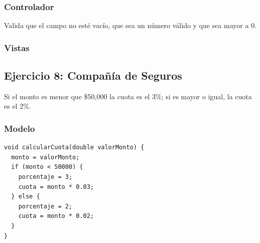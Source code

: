 \documentclass{article}
\begin{document}
\subsubsection{Controlador}
Valida que el campo no esté vacío, que sea un número válido y que sea mayor a 0.

\subsubsection{Vistas}
\begin{figure}[H]
\centering
\begin{minipage}{0.45\textwidth}\centering
\end{minipage}\hfill
\begin{minipage}{0.45\textwidth}\centering
\end{minipage}
\end{figure}

\subsection{Ejercicio 8: Compañía de Seguros}
Si el monto es menor que \$50,000 la cuota es el 3\%; si es mayor o igual, la cuota es el 2\%.

\subsubsection{Modelo}
\begin{tcolorbox}[title=CuotaFinanzaModel]
\begin{lstlisting}
void calcularCuota(double valorMonto) {
  monto = valorMonto;
  if (monto < 50000) {
    porcentaje = 3;
    cuota = monto * 0.03;
  } else {
    porcentaje = 2;
    cuota = monto * 0.02;
  }
}
\end{lstlisting}
\end{tcolorbox}
\end{document}
